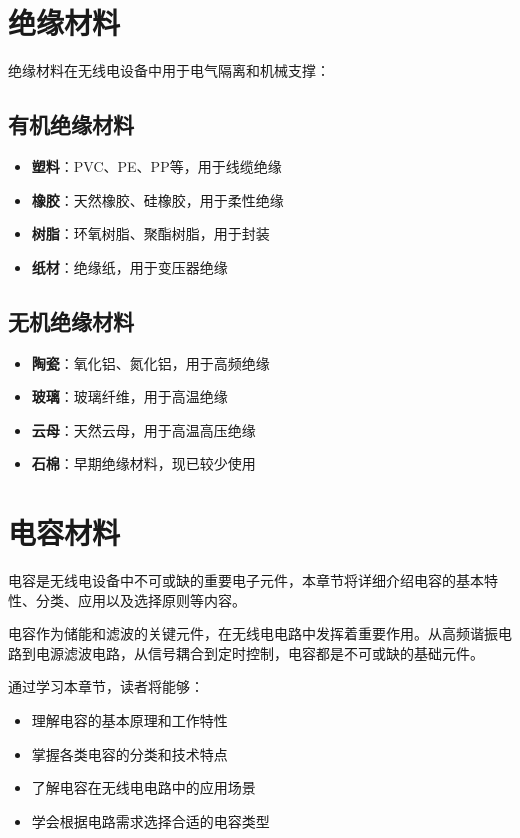 \documentclass[12pt,UTF8]{ctexbook}
\begin{document}
\chapter{绝缘材料}

绝缘材料在无线电设备中用于电气隔离和机械支撑：

\section{有机绝缘材料}

\begin{itemize}[leftmargin=3.5em]
    \item \textbf{塑料}：PVC、PE、PP等，用于线缆绝缘
    \item \textbf{橡胶}：天然橡胶、硅橡胶，用于柔性绝缘
    \item \textbf{树脂}：环氧树脂、聚酯树脂，用于封装
    \item \textbf{纸材}：绝缘纸，用于变压器绝缘
\end{itemize}

\section{无机绝缘材料}

\begin{itemize}[leftmargin=3.5em]
    \item \textbf{陶瓷}：氧化铝、氮化铝，用于高频绝缘
    \item \textbf{玻璃}：玻璃纤维，用于高温绝缘
    \item \textbf{云母}：天然云母，用于高温高压绝缘
    \item \textbf{石棉}：早期绝缘材料，现已较少使用
\end{itemize}

\chapter{电容材料}

电容是无线电设备中不可或缺的重要电子元件，本章节将详细介绍电容的基本特性、分类、应用以及选择原则等内容。

电容作为储能和滤波的关键元件，在无线电电路中发挥着重要作用。从高频谐振电路到电源滤波电路，从信号耦合到定时控制，电容都是不可或缺的基础元件。

通过学习本章节，读者将能够：

\begin{itemize}[leftmargin=3.5em]
    \item 理解电容的基本原理和工作特性
    \item 掌握各类电容的分类和技术特点
    \item 了解电容在无线电电路中的应用场景
    \item 学会根据电路需求选择合适的电容类型
\end{itemize}
\end{document}
